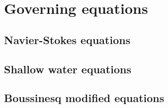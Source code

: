 
\chapter{Governing equations}

\section{Navier-Stokes equations}


\section{Shallow water equations}


\section{Boussinesq modified equations}



